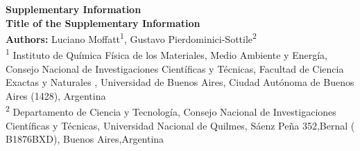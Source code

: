 \documentclass[12pt]{article}
\begin{document}
	
	\begin{center}
		\Large\textbf{Supplementary Information}\\[1em]
		\normalsize
		\textbf{Title of the Supplementary Information}\\[1em]
		\textbf{Authors:} Luciano Moffatt\textsuperscript{1}, Gustavo Pierdominici-Sottile\textsuperscript{2}\\[1em]
		\small
		\textsuperscript{1} Instituto de Qu\'{i}mica F\'{i}sica de los Materiales, Medio Ambiente y Energ\'{i}a, Consejo Nacional de Investigaciones Científicas y T\'{e}cnicas, Facultad de Ciencia Exactas y Naturales , Universidad de Buenos Aires, Ciudad Aut\'{o}noma de Buenos Aires (1428), Argentina\\
		\textsuperscript{2} Departamento de Ciencia y Tecnolog\'{i}a, 
		Consejo Nacional de Investigaciones Científicas y T\'{e}cnicas,  Universidad Nacional de Quilmes, S\'{a}enz Pe\~{n}a 352,Bernal ( B1876BXD), Buenos Aires,Argentina\\
		
	\end{center}
	
	
\end{document}
